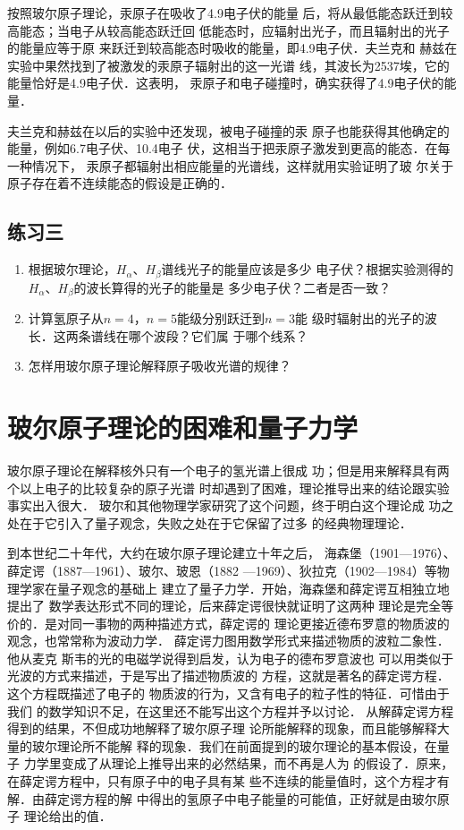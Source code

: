 按照玻尔原子理论，汞原子在吸收了4.9电子伏的能量
后，将从最低能态跃迁到较高能态；当电子从较高能态跃迁回
低能态时，应辐射出光子，而且辐射出的光子的能量应等于原
来跃迁到较高能态时吸收的能量，即4.9电子伏．夫兰克和
赫兹在实验中果然找到了被激发的汞原子辐射出的这一光谱
线，其波长为2537埃，它的能量恰好是4.9电子伏．这表明，
汞原子和电子碰撞时，确实获得了4.9电子伏的能量．

夫兰克和赫兹在以后的实验中还发现，被电子碰撞的汞
原子也能获得其他确定的能量，例如6.7电子伏、10.4电子
伏，这相当于把汞原子激发到更高的能态．在每一种情况下，
汞原子都辐射出相应能量的光谱线，这样就用实验证明了玻
尔关于原子存在着不连续能态的假设是正确的．


\subsection*{练习三}
\begin{enumerate}
    \item 根据玻尔理论，$H_{\alpha}$、$H_{\beta}$谱线光子的能量应该是多少
电子伏？根据实验测得的$H_{\alpha}$、$H_{\beta}$的波长算得的光子的能量是
多少电子伏？二者是否一致？
\item 计算氢原子从$n=4$，$n=5$能级分别跃迁到$n=3$能
级时辐射出的光子的波长．这两条谱线在哪个波段？它们属
于哪个线系？
\item 怎样用玻尔原子理论解释原子吸收光谱的规律？
\end{enumerate}


\section{玻尔原子理论的困难和量子力学}

玻尔原子理论在解释核外只有一个电子的氢光谱上很成
功；但是用来解释具有两个以上电子的比较复杂的原子光谱
时却遇到了困难，理论推导出来的结论跟实验事实出入很大．
玻尔和其他物理学家研究了这个问题，终于明白这个理论成
功之处在于它引入了量子观念，失败之处在于它保留了过多
的经典物理理论．

到本世纪二十年代，大约在玻尔原子理论建立十年之后，
海森堡（1901—1976）、薛定谔（1887—1961）、玻尔、玻恩（1882
—1969）、狄拉克（1902—1984）等物理学家在量子观念的基础上
建立了量子力学．开始，海森堡和薛定谔互相独立地提出了
数学表达形式不同的理论，后来薛定谔很快就证明了这两种
理论是完全等价的．是对同一事物的两种描述方式，薛定谔的
理论更接近德布罗意的物质波的观念，也常常称为波动力学．
薛定谔力图用数学形式来描述物质的波粒二象性．他从麦克
斯韦的光的电磁学说得到启发，认为电子的德布罗意波也
可以用类似于光波的方式来描述，于是写出了描述物质波的
方程，这就是著名的薛定谔方程．这个方程既描述了电子的
物质波的行为，又含有电子的粒子性的特征．可惜由于我们
的数学知识不足，在这里还不能写出这个方程并予以讨论．
从解薛定谔方程得到的结果，不但成功地解释了玻尔原子理
论所能解释的现象，而且能够解释大量的玻尔理论所不能解
释的现象．我们在前面提到的玻尔理论的基本假设，在量子
力学里变成了从理论上推导出来的必然结果，而不再是人为
的假设了．原来，在薛定谔方程中，只有原子中的电子具有某
些不连续的能量值时，这个方程才有解．由薛定谔方程的解
中得出的氢原子中电子能量的可能值，正好就是由玻尔原子
理论给出的值．

